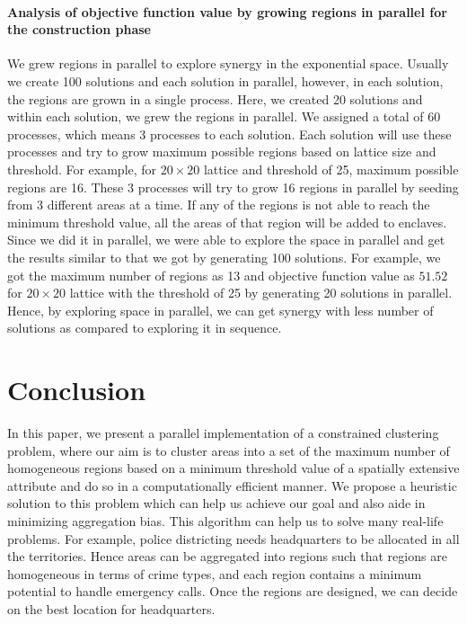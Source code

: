 \documentclass[conference]{IEEEtran}
\begin{document}
\paragraph{Analysis of objective function value by growing regions in parallel for the construction phase}
We grew regions in parallel to explore synergy in the exponential space. Usually we create 100 solutions and each solution in parallel, however, in each solution, the regions are grown in a single process. Here, we created 20 solutions and within each solution, we grew the regions in parallel. We assigned a total of 60 processes, which means 3 processes to each solution. Each solution will use these processes and try to grow maximum possible regions based on lattice size and threshold. For example, for $20\times 20$ lattice and threshold of 25, maximum possible regions are 16. These 3 processes will try to grow 16 regions in parallel by seeding from 3 different areas at a time. If any of the regions is not able to reach the minimum threshold value, all the areas of that region will be added to enclaves. Since we did it in parallel, we were able to explore the space in parallel and get the results similar to that we got by generating 100 solutions. For example, we got the maximum number of regions as 13 and objective function value as $51.52$ for $20\times 20$ lattice with the threshold of 25 by generating 20 solutions in parallel. Hence, by exploring space in parallel, we can get synergy with less number of solutions as compared to exploring it in sequence.

\section{Conclusion}
In this paper, we present a parallel implementation of a constrained clustering
problem, where our aim is to cluster areas into a set of the maximum number of
homogeneous regions based on a minimum threshold value of a spatially extensive
attribute and do so in a computationally efficient manner. We propose a
heuristic solution to this problem which can help us achieve our goal and also
aide in minimizing aggregation bias. This algorithm can help us to solve many
real-life problems. For example, police districting needs headquarters to be
allocated in all the territories. Hence areas can be aggregated into regions
such that regions are homogeneous in terms of crime types, and each region
contains a minimum potential to handle emergency calls. Once the regions are
designed, we can decide on the best location for headquarters.
\end{document}
